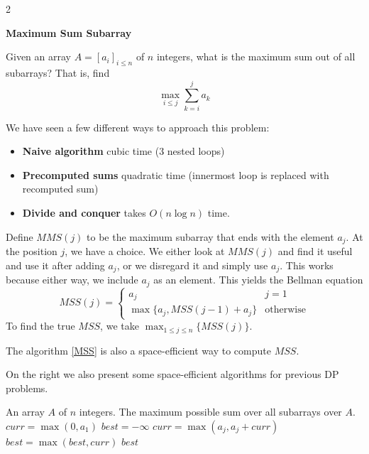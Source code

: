 \begin{paracol}{2}
\begin{leftbar}
    \textbf{Maximum Sum Subarray}

    Given an array $A = [a_i]_{i \leq n}$ of $n$ integers, what is the maximum sum out of all subarrays? That is, find 
    $$
    \max_{i \leq j}\sum_{k = i}^j a_k
    $$
\end{leftbar}
We have seen a few different ways to approach this problem: 
\begin{itemize}
    \item \textbf{Naive algorithm} cubic time (3 nested loops)
    \item \textbf{Precomputed sums} quadratic time (innermost loop is replaced with recomputed sum)
    \item \textbf{Divide and conquer} takes $O(n\log n)$ time. 
\end{itemize}

Define $MMS(j)$ to be the maximum subarray that ends with the element $a_j$. At the position $j$, we have a choice. We either look at $MMS(j)$ and find it useful and use it after adding $a_j$, or we disregard it and simply use $a_j$. This works because either way, we include $a_j$ as an element. This yields the Bellman equation 
$$
MSS(j) = 
\begin{cases}
    a_j & j = 1 \\
    \max\{a_j, MSS(j - 1) + a_j\} & \textrm{otherwise}
\end{cases}
$$
To find the true $MSS$, we take $\max_{1 \leq j \leq n} \{MSS(j)\}$. 

The algorithm \ref{MSS} is also a space-efficient way to compute $MSS$. 

On the right we also present some space-efficient algorithms for previous DP problems.  

\switchcolumn
\begin{algorithm}
    \caption{Saving Memory with MSS}
    \label{MSS}
    \begin{algorithmic}[1] 
    \Require An array $A$ of $n$ integers. 
    \Ensure The maximum possible sum over all subarrays over $A$. 
    \State $curr = \max (0, a_1)$
    \State $best = -\infty$
        \State $curr = \max(a_j, a_j + curr)$
        \State $best = \max(best, curr)$
    \EndFor
    \State \Return $best$
    \end{algorithmic}
\end{algorithm}
\bigskip


\end{paracol}
